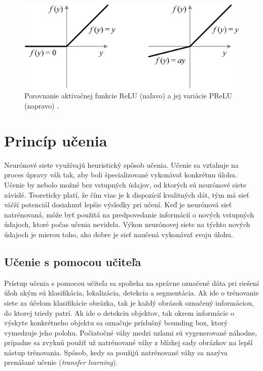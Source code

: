 \begin{figure}[ht]
    \centering
    \includegraphics[width=.6\textwidth]{images/02/relu_prelu.png}
    \caption{Porovnanie aktivačnej funkcie ReLU (naľavo) a jej variácie PReLU (napravo) \cite{prelu}.}
    \label{img:rr}
\end{figure}

\section{Princíp učenia}

Neurónové siete využívajú heuristický spôsob učenia. Učenie sa vzťahuje na proces úpravy váh tak, aby boli špecializované vykonávať konkrétnu úlohu. Učenie by nebolo možné bez vstupných údajov, od ktorých sú neurónové siete závislé. Teoreticky platí, že čím viac je k dispozícií kvalitných dát, tým má sieť väčší potenciál dosiahnuť lepšie výsledky pri učení. Keď je neurónová sieť natrénovaná, môže byť použitá na predpovedanie informácií o nových vstupných údajoch, ktoré počas učenia nevidela. Výkon neurónovej siete na týchto nových údajoch je mierou toho, ako dobre je sieť naučená vykonávať svoju úlohu.

\subsection{Učenie s pomocou učiteľa}
Prístup učenia s pomocou učiteľa sa spolieha na správne označené dáta pri riešení úloh akým sú klasifikácia, lokalizácia, detekcia a segmentácia. Ak ide o trénovanie siete za účelom klasifikácie obrázka, tak je každý obrázok označený informáciou, do ktorej triedy patrí. Ak ide o detekciu objektov, tak okrem informácie o výskyte konkrétneho objektu sa označuje príslušný bounding box, ktorý vymedzuje jeho polohu. Počiatočné váhy medzi uzlami sú vygenerované náhodne, prípadne sa zvyknú použiť už natrénované váhy z blízkej sady obrázkov na lepší nástup trénovania. Spôsob, kedy sa použijú natrénované váhy sa nazýva prenášané učenie (\textit{transfer learning}).

